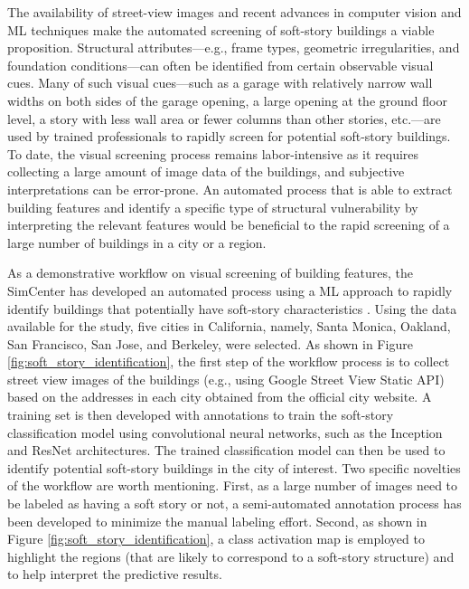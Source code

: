 The availability of street-view images and recent advances in computer vision and ML techniques make the automated screening of soft-story buildings a viable proposition. Structural attributes---e.g., frame types, geometric irregularities, and foundation conditions---can often be identified from certain observable visual cues. Many of such visual cues---such as a garage with relatively narrow wall widths on both sides of the garage opening, a large opening at the ground floor level, a story with less wall area or fewer columns than other stories, etc.---are used by trained professionals to rapidly screen for potential soft-story buildings. To date, the visual screening process remains labor-intensive as it requires collecting a large amount of image data of the buildings, and subjective interpretations can be error-prone. An automated process that is able to extract building features and identify a specific type of structural vulnerability by interpreting the relevant features would be beneficial to the rapid screening of a large number of buildings in a city or a region. 

As a demonstrative workflow on visual screening of building features, the SimCenter has developed an automated process using a ML approach to rapidly identify buildings that potentially have soft-story characteristics \citep{yu2019building,yu2020largescale}. Using the data available for the study, five cities in California, namely, Santa Monica, Oakland, San Francisco, San Jose, and Berkeley, were selected. As shown in Figure \ref{fig:soft_story_identification}, the first step of the workflow process is to collect street view images of the buildings (e.g., using Google Street View Static API) based on the addresses in each city obtained from the official city website. A training set is then developed with annotations to train the soft-story classification model using convolutional neural networks, such as the Inception \citep{szegedy2016rethinking,szegedy2017inceptionv4} and ResNet \citep{he2016deep} architectures. The trained classification model can then be used to identify potential soft-story buildings in the city of interest. Two specific novelties of the workflow are worth mentioning. First, as a large number of images need to be labeled as having a soft story or not, a semi-automated annotation process has been developed to minimize the manual labeling effort. Second, as shown in Figure \ref{fig:soft_story_identification}, a class activation map \citep{zhou2016learning} is employed to highlight the regions (that are likely to correspond to a soft-story structure) and to help interpret the predictive results.

